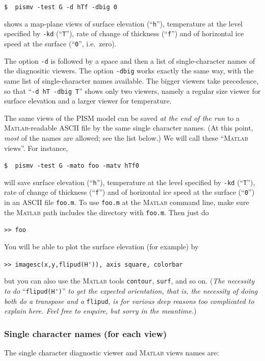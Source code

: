 \documentclass[11pt,final]{amsart}
\renewcommand{\t}[1]{\texttt{#1}}
\newcommand{\Matlab}{\textsc{Matlab}\xspace}
\begin{document}
\verb|$  pismv -test G -d hTf -dbig 0|

\noindent shows a map-plane views of surface elevation (``\t{h}''), temperature at the level specified by \t{-kd} (``\t{T}''), rate of change of thickness (``\t{f}'') and of horizontal ice speed at the surface (``\t{0}'', i.e.~zero).

The option \t{-d} is followed by a space and then a list of single-character names of the diagnositic viewers.  The option \t{-dbig} works exactly the same way, with the same list of single-character names available.  The bigger viewers take precedence, so that ``\t{-d hT -dbig T}'' shows only two viewers, namely a regular size viewer for surface elevation and a larger viewer for temperature.
\medskip

The same views of the PISM model can be saved \emph{at the end of the run} to a \Matlab-readable ASCII file by the same single character names.  (At this point, \emph{most} of the names are allowed; see the list below.)  We will call these ``\Matlab views''.  For instance,

\verb|$  pismv -test G -mato foo -matv hTf0|

\noindent will save surface elevation (``\t{h}''), temperature at the level specified by \t{-kd} (``\t{T}''), rate of change of thickness (``\t{f}'') and of horizontal ice speed at the surface (``\t{0}'') in an ASCII file \verb|foo.m|.  To use \verb|foo.m| at the \Matlab command line, make sure the \Matlab path includes the directory with \verb|foo.m|.  Then just do

\verb|>> foo|

\noindent You will be able to plot the surface elevation (for example) by

\verb|>> imagesc(x,y,flipud(H')), axis square, colorbar|

\noindent but you can also use the \Matlab tools \verb|contour|, \verb|surf|, and so on.  (\emph{The necessity to do} ``\verb|flipud(H')|'' \emph{to get the expected orientation, that is, the necessity of doing both do a transpose \emph{and} a} \verb|flipud|, \emph{is for various deep reasons too complicated to explain here.  Feel free to enquire, but \emph{sorry} in the meantime.})


\subsubsection*{Single character names (for each view)}  The single character diagnostic viewer and \Matlab views names are:
\newcommand{\notMat}{(\emph{NOT available as a} \Matlab \emph{view}.)\xspace\xspace}
\end{document}
